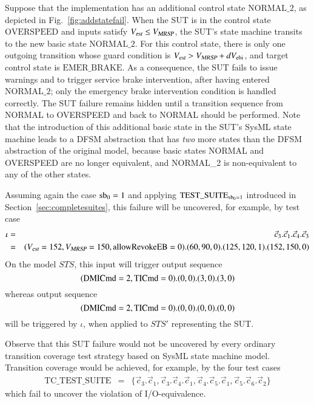 Suppose that the implementation has an additional  control state $\text{NORMAL\_2}$, as depicted in Fig.~\ref{fig:addstatefail}. When the SUT is in the control state $\text{OVERSPEED}$ and inputs satisfy ${V_{\text{\sl est}}}\le {V_{\text{\sl MRSP}}}$, the SUT's state machine transits to the new basic state  
$\text{NORMAL\_2}$. For this control state, there is only one outgoing transition whose guard condition is $ {V_{\text{\sl est}}} > {V_{\text{\sl MRSP}}} + dV_{\text {ebi}}$, and target control state is $\text {EMER\_BRAKE}$.
As a consequence, the SUT fails to issue warnings and to trigger service brake intervention, after having entered $\text{NORMAL\_2}$; only the emergency brake intervention condition is handled correctly. The SUT failure remains hidden until a transition sequence from {\sf NORMAL} to {\sf OVERSPEED} and back to {\sf NORMAL} should be performed. Note that the introduction of this additional basic state in the SUT's SysML state machine leads to a DFSM abstraction that has {\it two} more states than the DFSM abstraction of the original model, because basic states {\sf NORMAL} and {\sf OVERSPEED} are no longer equivalent, and {\sf NORMAL\_2} is non-equivalent to any of the other states.


Assuming again the case $\text{sb}_0=1$ and applying $\text{TEST\_SUITE}_{\text{sb}_0=1}$ introduced in Section~\ref{sec:completesuites}, this failure will be uncovered, for example, by test case
\footnotesize
\begin{eqnarray*}
\iota & = & \vec c_3.\vec c_1.\vec c_4.\vec c_3 
\\ & = & ({V_{\text{\sl est}}}=152,{V_{\text{\sl MRSP}}}=150,\text{allowRevokeEB}=0).(60,90,0).(125,120,1).(152,150,0)
\end{eqnarray*}
\normalsize
On the model $STS$, this input will trigger output sequence
$$
(\text{DMICmd}=2,\text{TICmd}=0).(0,0).(3,0).(3,0)
$$
whereas output sequence
$$
(\text{DMICmd}=2,\text{TICmd}=0).(0,0).(0,0).(0,0)
$$
will be triggered by $\iota$, when applied to $STS'$ representing the SUT. 

Observe that this SUT failure would not be uncovered by every ordinary transition coverage test strategy based on SysML state machine model. Transition coverage would be achieved, for example, by the four test cases
\begin{eqnarray*}
\text{TC\_TEST\_SUITE} & = & \{ \vec c_3.\vec c_1, \vec c_3.\vec c_4.\vec c_1,\vec c_4.\vec c_5.\vec c_1,\vec c_5.\vec c_6.\vec c_2  \}  
\end{eqnarray*}
which fail to uncover the violation of I/O-equivalence.

 



